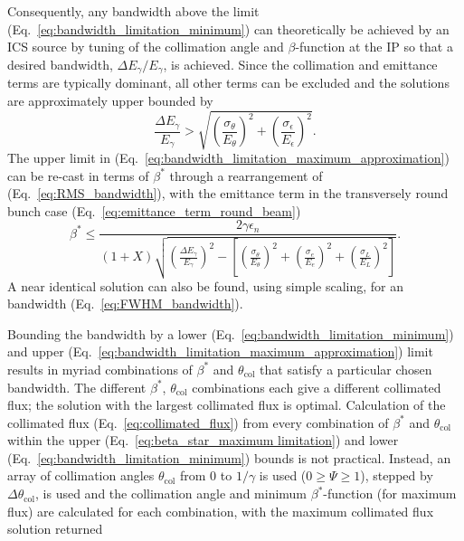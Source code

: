 \documentclass[../main.tex]{subfiles}
\begin{document}
Consequently, any bandwidth above the 
limit (Eq.~\ref{eq:bandwidth_limitation_minimum}) can theoretically be achieved by an ICS source by tuning of the collimation angle and $\beta$-function at the IP so that a desired bandwidth, $\Delta E_{\gamma}/E_{\gamma}$, is achieved. Since the collimation and emittance terms are typically dominant, all other terms can be excluded and the solutions are approximately upper bounded by
\begin{equation}
\frac{\Delta E_{\gamma}}{E_{\gamma}} > \sqrt{\left(\frac{ \sigma_{\theta}}{E_{\theta}}\right)^{2}+\left(\frac{\sigma_{\epsilon}}{E_{\epsilon}}\right)^{2}}.
\label{eq:bandwidth_limitation_maximum_approximation}
\end{equation}
The upper limit in (Eq.~\ref{eq:bandwidth_limitation_maximum_approximation}) can be re-cast in terms of $\beta^{*}$ through a rearrangement of (Eq.~\ref{eq:RMS_bandwidth}), with the emittance term in the transversely round bunch case (Eq.~\ref{eq:emittance_term_round_beam})
\begin{equation}
\beta^{*} \leq \frac{2\gamma\epsilon_{n}}{\left(1+X\right)\sqrt{\left(\frac{\Delta E_{\gamma}}{E_{\gamma}}\right)^{2}-\left[\left(\frac{\sigma_{\theta}}{E_{\theta}}\right)^{2}+\left(\frac{\sigma_{e}}{E_{e}}\right)^{2}+\left(\frac{\sigma_{L}}{E_{L}}\right)^{2}\right]}}.
\label{eq:beta_star_maximum limitation}
\end{equation}
A near identical solution can also be found, using simple scaling, for an  bandwidth (Eq.~\ref{eq:FWHM_bandwidth}). 

Bounding the  bandwidth by a lower (Eq.~\ref{eq:bandwidth_limitation_minimum}) and upper (Eq.~\ref{eq:bandwidth_limitation_maximum_approximation}) limit results in myriad combinations of $\beta^{*}$ and $\theta_{\mathrm{col}}$ that satisfy a particular chosen bandwidth. The different $\beta^{*}$, $\theta_{\mathrm{col}}$ combinations each give a different collimated flux; the solution with the largest collimated flux is optimal. Calculation of the collimated flux (Eq.~\ref{eq:collimated_flux}) from every combination of $\beta^{*}$ and $\theta_{\mathrm{col}}$ within the upper (Eq.~\ref{eq:beta_star_maximum limitation}) and lower (Eq.~\ref{eq:bandwidth_limitation_minimum}) bounds is not practical. Instead, an array of collimation angles $\theta_{\mathrm{col}}$ from 0 to $1/\gamma$ is used ($0\geq\Psi\geq1$), stepped by $\Delta\theta_{\mathrm{col}}$, is used and the collimation angle and minimum $\beta^{*}$-function (for maximum flux) are calculated for each combination, with the maximum collimated flux solution returned 
\end{document}
